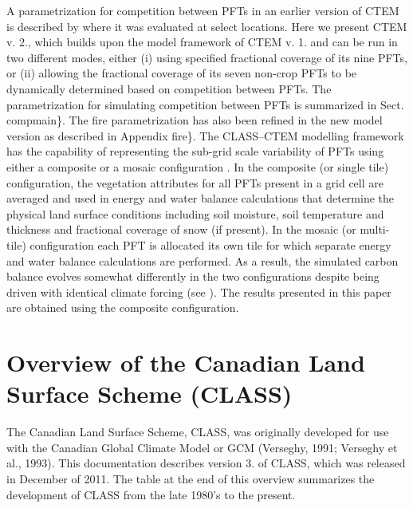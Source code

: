 A parametrization for competition between P\+F\+Ts in an earlier version of C\+T\+E\+M is described by \cite{Arora2006-pp} \cite{Arora2006-ax} where it was evaluated at select locations. Here we present C\+T\+E\+M v. 2., which builds upon the model framework of C\+T\+E\+M v. 1. and can be run in two different modes, either (i) using specified fractional coverage of its nine P\+F\+Ts, or (ii) allowing the fractional coverage of its seven non-\/crop P\+F\+Ts to be dynamically determined based on competition between P\+F\+Ts. The parametrization for simulating competition between P\+F\+Ts is summarized in Sect. compmain\}. The fire parametrization has also been refined in the new model version as described in Appendix fire\}. The C\+L\+A\+S\+S--C\+T\+E\+M modelling framework has the capability of representing the sub-\/grid scale variability of P\+F\+Ts using either a composite or a mosaic configuration \cite{Li2012-f7f} \cite{Melton2014-xk}. In the composite (or single tile) configuration, the vegetation attributes for all P\+F\+Ts present in a grid cell are averaged and used in energy and water balance calculations that determine the physical land surface conditions including soil moisture, soil temperature and thickness and fractional coverage of snow (if present). In the mosaic (or multi-\/tile) configuration each P\+F\+T is allocated its own tile for which separate energy and water balance calculations are performed. As a result, the simulated carbon balance evolves somewhat differently in the two configurations despite being driven with identical climate forcing (see \cite{Melton2014-xk}). The results presented in this paper are obtained using the composite configuration.\hypertarget{index_overviewCLASS}{}\section{Overview of the Canadian Land Surface Scheme (\+C\+L\+A\+S\+S)}\label{index_overviewCLASS}
The Canadian Land Surface Scheme, C\+L\+A\+S\+S, was originally developed for use with the Canadian Global Climate Model or G\+C\+M (Verseghy, 1991; Verseghy et al., 1993). This documentation describes version 3. of C\+L\+A\+S\+S, which was released in December of 2011. The table at the end of this overview summarizes the development of C\+L\+A\+S\+S from the late 1980’s to the present.

